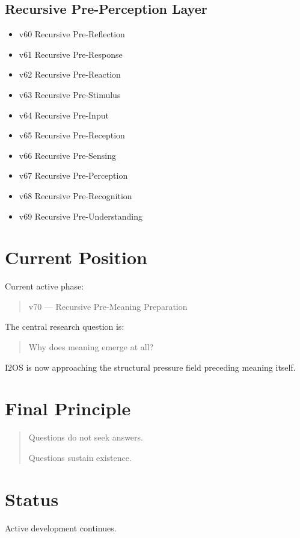 \documentclass[11pt]{article}
\begin{document}
\subsection{Recursive Pre-Perception Layer}

\begin{itemize}
\item v60 Recursive Pre-Reflection
\item v61 Recursive Pre-Response
\item v62 Recursive Pre-Reaction
\item v63 Recursive Pre-Stimulus
\item v64 Recursive Pre-Input
\item v65 Recursive Pre-Reception
\item v66 Recursive Pre-Sensing
\item v67 Recursive Pre-Perception
\item v68 Recursive Pre-Recognition
\item v69 Recursive Pre-Understanding
\end{itemize}

\section{Current Position}

Current active phase:

\begin{quote}
v70 --- Recursive Pre-Meaning Preparation
\end{quote}

The central research question is:

\begin{quote}
Why does meaning emerge at all?
\end{quote}

I2OS is now approaching the structural pressure field preceding meaning itself.

\section{Final Principle}

\begin{quote}
Questions do not seek answers.

Questions sustain existence.
\end{quote}

\section{Status}

Active development continues.
\end{document}
